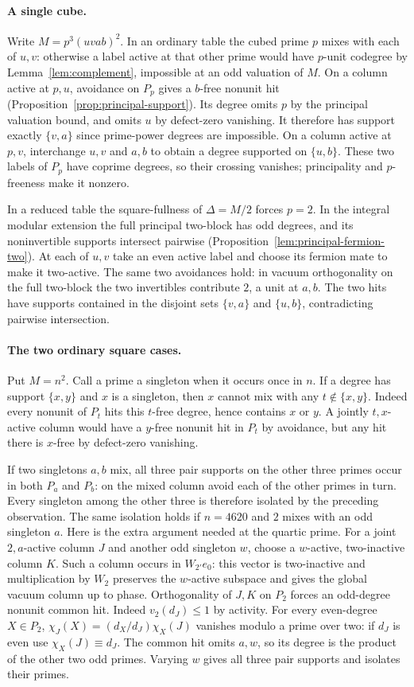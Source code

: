 \documentclass[11pt,a4paper]{article}
\numberwithin{equation}{section}
\theoremstyle{remark}
\begin{document}
\paragraph{A single cube.}
Write $M=p^3(u v a b)^2$. In an ordinary table the cubed prime $p$
mixes with each of $u,v$: otherwise a label active at that other prime
would have $p$-unit codegree by Lemma~\ref{lem:complement}, impossible
at an odd valuation of $M$. On a column active at $p,u$, avoidance on
$P_p$ gives a $b$-free nonunit hit (Proposition~\ref{prop:principal-support}).
Its degree omits $p$ by the principal valuation bound, and omits $u$
by defect-zero vanishing. It therefore has support exactly $\{v,a\}$
since prime-power degrees are impossible. On a column active at $p,v$,
interchange $u,v$ and $a,b$ to obtain a degree supported on $\{u,b\}$.
These two labels of $P_p$ have coprime degrees, so their crossing
vanishes; principality and $p$-freeness make it nonzero.

In a reduced table the square-fullness of $\Delta=M/2$ forces $p=2$.
In the integral modular extension the full principal two-block has odd
degrees, and its noninvertible supports intersect pairwise
(Proposition~\ref{lem:principal-fermion-two}). At each of $u,v$ take
an even active label and choose its fermion mate to make it two-active.
The same two avoidances hold: in vacuum orthogonality on the full
two-block the two invertibles contribute $2$, a unit at $a,b$.
The two hits have supports contained in the disjoint sets $\{v,a\}$
and $\{u,b\}$, contradicting pairwise intersection.

\paragraph{The two ordinary square cases.}
Put $M=n^2$. Call a prime a singleton when it occurs once in $n$.
If a degree has support $\{x,y\}$ and $x$ is a singleton, then $x$
cannot mix with any $t\notin\{x,y\}$. Indeed every nonunit of $P_t$
hits this $t$-free degree, hence contains $x$ or $y$. A jointly
$t,x$-active column would have a $y$-free nonunit hit in $P_t$ by
avoidance, but any hit there is $x$-free by defect-zero vanishing.

If two singletons $a,b$ mix, all three pair supports on the other three
primes occur in both $P_a$ and $P_b$: on the mixed column avoid each
of the other primes in turn. Every singleton among the other three
is therefore isolated by the preceding observation. The same isolation
holds if $n=4620$ and $2$ mixes with an odd singleton $a$. Here is the
extra argument needed at the quartic prime. For a joint $2,a$-active
column $J$ and another odd singleton $w$, choose a $w$-active,
two-inactive column $K$. Such a column occurs in $W_{2'}e_0$:
this vector is two-inactive and multiplication by $W_2$ preserves the
$w$-active subspace and gives the global vacuum column up to phase.
Orthogonality of $J,K$ on $P_2$ forces an odd-degree nonunit common hit.
Indeed $v_2(d_J)\le1$ by activity. For every even-degree $X\in P_2$,
$\chi_J(X)=(d_X/d_J)\chi_X(J)$ vanishes modulo a prime over two:
if $d_J$ is even use $\chi_X(J)\equiv d_J$. The common hit omits
$a,w$, so its degree is the product of the other two odd primes.
Varying $w$ gives all three pair supports and isolates their primes.
\end{document}
